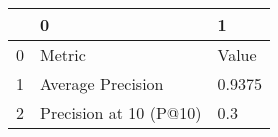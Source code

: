 \begin{tabular}{lll}
\toprule
{} &                       0 &       1 \\
\midrule
0 &                  Metric &   Value \\
1 &       Average Precision &  0.9375 \\
2 &  Precision at 10 (P@10) &     0.3 \\
\bottomrule
\end{tabular}
